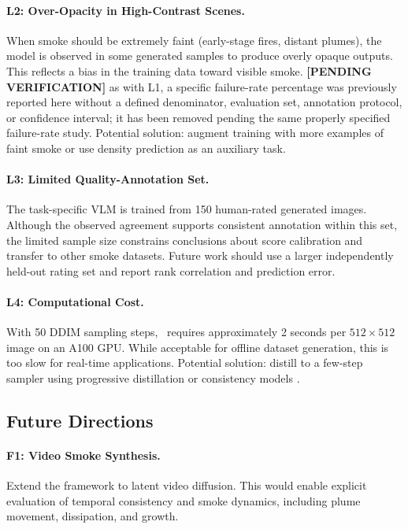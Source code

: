 \documentclass[journal]{IEEEtran}
\begin{document}
\paragraph{L2: Over-Opacity in High-Contrast Scenes.}
When smoke should be extremely faint (early-stage fires, distant plumes),
the model is observed in some generated samples to produce overly opaque
outputs. This reflects a bias in the training data toward visible smoke.
\textbf{[PENDING VERIFICATION]} as with L1, a specific failure-rate
percentage was previously reported here without a defined denominator,
evaluation set, annotation protocol, or confidence interval; it has been
removed pending the same properly specified failure-rate study. Potential
solution: augment training with more examples of faint smoke or use
density prediction as an auxiliary task.

\paragraph{L3: Limited Quality-Annotation Set.}
The task-specific VLM is trained from 150 human-rated generated images. Although the observed agreement supports consistent annotation within this set, the limited sample size constrains conclusions about score calibration and transfer to other smoke datasets. Future work should use a larger independently held-out rating set and report rank correlation and prediction error.

\paragraph{L4: Computational Cost.}
With 50 DDIM sampling steps, \method~requires approximately 2 seconds per $512\times512$ image on an A100 GPU. While acceptable for offline dataset generation, this is too slow for real-time applications. Potential solution: distill to a few-step sampler using progressive distillation \cite{salimans2022progressivedistillationfastsampling} or consistency models \cite{song2023consistencymodels}.

\subsection{Future Directions}

\paragraph{F1: Video Smoke Synthesis.}
Extend the framework to latent video diffusion. This would enable explicit evaluation of temporal consistency and smoke dynamics, including plume movement, dissipation, and growth.
\end{document}
